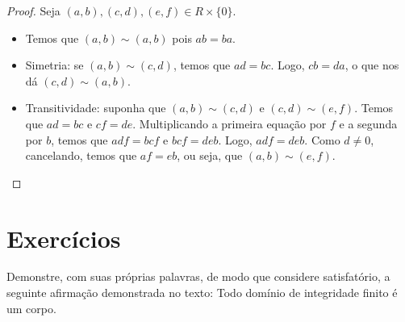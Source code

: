 \begin{proof}
    Seja $(a, b), (c, d), (e, f) \in R\times \{0\}$.
    \begin{itemize}
        \item Temos que $(a, b)\sim (a, b)$ pois $ab=ba$.
        \item Simetria: se $(a, b)\sim (c, d)$, temos que $ad=bc$.
        Logo, $cb=da$, o que nos dá $(c, d)\sim (a, b)$.
        \item Transitividade: suponha que $(a, b)\sim (c, d)$ e $(c, d)\sim (e, f)$.
        Temos que $ad=bc$ e $cf=de$.
        Multiplicando a primeira equação por $f$ e a segunda por $b$, temos que $adf=bcf$ e $bcf=deb$.
        Logo, $adf=deb$.
        Como $d\neq 0$, cancelando, temos que $af=eb$, ou seja, que $(a, b)\sim (e, f)$.
    \end{itemize}
\end{proof}
\section{Exercícios}
\begin{exer}
    Demonstre, com suas próprias palavras, de modo que considere satisfatório, a seguinte afirmação demonstrada no texto: Todo domínio de integridade finito é um corpo.
\end{exer}